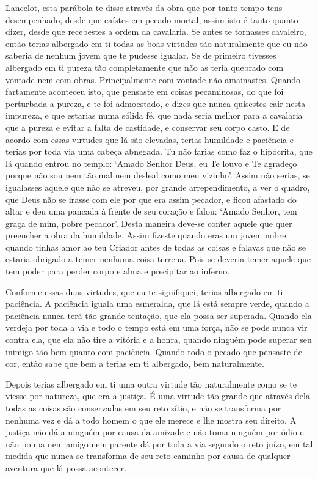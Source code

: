 Lancelot, esta parábola te disse através da obra que por tanto tempo tens
desempenhado, desde que caístes em pecado mortal, assim isto é tanto quanto
dizer, desde que recebestes a ordem da cavalaria. Se antes te tornasses
cavaleiro, então terias albergado em ti todas as boas virtudes tão naturalmente
que eu não saberia de nenhum jovem que te pudesse igualar. Se de primeiro
tivesses albergado em ti pureza tão completamente que não as teria quebrado com
vontade nem com obras. Principalmente com vontade não amainastes. Quando
fartamente aconteceu isto, que pensaste em coisas pecaminosas, do que foi
perturbada a pureza, e te foi admoestado, e dizes que nunca quisestes cair
nesta impureza, e que estarias numa sólida fé, que nada seria melhor para a
cavalaria que a pureza e evitar a falta de castidade, e conservar seu corpo
casto. E de acordo com essas virtudes que lá são elevadas, terias humildade e
paciência e terias por toda via uma cabeça abnegada. Tu não farias como faz o
hipócrita, que lá quando entrou no templo: ‘Amado Senhor Deus, eu Te louvo e Te
agradeço porque não sou nem tão mal nem desleal como meu vizinho’. Assim não
serias, se igualasses aquele que não se atreveu, por grande arrependimento, a
ver o quadro, que Deus não se irasse com ele por que era assim pecador, e ficou
afastado do altar e deu uma pancada à frente de seu coração e falou: ‘Amado
Senhor, tem graça de mim, pobre pecador’. Desta maneira deve-se conter aquele
que quer preencher a obra da humildade. Assim fizeste quando eras um jovem
nobre, quando tinhas amor ao teu Criador antes de todas as coisas e falavas que
não se estaria obrigado a temer nenhuma coisa terrena. Pois se deveria temer
aquele que tem poder para perder corpo e alma e precipitar ao inferno.

Conforme essas duas virtudes, que eu te signifiquei, terias albergado em ti
paciência. A paciência iguala uma esmeralda, que lá está sempre verde, quando a
paciência nunca terá tão grande tentação, que ela possa ser superada. Quando
ela verdeja por toda a via e todo o tempo está em uma força, não se pode nunca
vir contra ela, que ela não tire a vitória e a honra, quando ninguém pode
superar seu inimigo tão bem quanto com paciência. Quando todo o pecado que
pensaste de cor, então sabe que bem a terias em ti albergado, bem naturalmente.

Depois terias albergado em ti uma outra virtude tão naturalmente como se te
viesse por natureza, que era a justiça. É uma virtude tão grande que através
dela todas as coisas são conservadas em seu reto sítio, e não se transforma por
nenhuma vez e dá a todo homem o que ele merece e lhe mostra seu direito. A
justiça não dá a ninguém por causa da amizade e não toma ninguém por ódio e não
poupa nem amigo nem parente dá por toda a via segundo o reto juízo, em tal
medida que nunca se transforma de seu reto caminho por causa de qualquer
aventura que lá possa acontecer.

